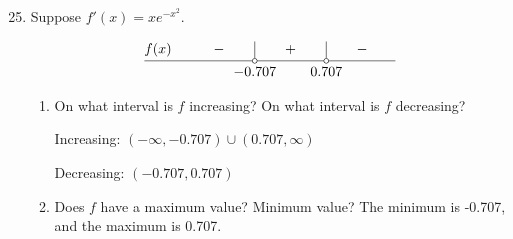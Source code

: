 \documentclass{article}
\begin{document}
\begin{enumerate}
\setcounter{enumi}{24}
	\item Suppose $f'(x)=xe^{-x^2}$.
\def\crulefill{\leaders\hrule
  height \dimexpr\fontdimen22\textfont2+0.2pt\relax
  depth -\dimexpr\fontdimen22\textfont2-0.2pt\relax
  \hfill
}
\def\hollow{$\kern-.8pt\circ\kern-.8pt$}
\def\filled{$\kern-.8pt\bullet\kern-.8pt$}

$$
\vbox{\offinterlineskip\tabskip=0pt
  \halign{%
    \strut$#$\hfil\quad&
    \hfil\qquad$#$\qquad\hfil&
    \hfil\vrule#\hfil&
    \hfil\qquad$#$\qquad\hfil&
    \hfil\vrule#\hfil&
    \hfil\qquad$#$\qquad\hfil\cr
  f(x)&-&&+&&-\cr
  \multispan{2}\crulefill&\omit\hfil\hollow\hfil&
    \omit\crulefill&\omit\hfil\hollow\hfil&\omit\crulefill\cr
  & &\omit\hidewidth$-0.707$\hidewidth& &\omit\hidewidth$0.707$\hidewidth& \cr
}}
$$

	\begin{enumerate}
		\item On what interval is $f$ increasing? On what interval is $f$ decreasing?\newline
		\begin{minipage}[t]{0.5\linewidth}
			Increasing: $(-\infty, -0.707)\cup(0.707, \infty)$
		\end{minipage}
		\begin{minipage}[t]{0.5\linewidth}
			Decreasing: $(-0.707,0.707)$
		\end{minipage}
		\item Does $f$ have a maximum value? Minimum value?\newline
			The minimum is -0.707, and the maximum is 0.707.
	\end{enumerate}
\end{enumerate}
\end{document}
